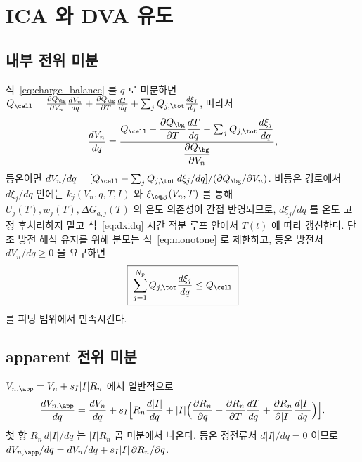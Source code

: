 \section{ICA 와 DVA 유도}\label{sec:ica}
\subsection{내부 전위 미분}
식~\eqref{eq:charge_balance} 를 $q$ 로 미분하면
$Q_\cell=\frac{\partial Q_\bg}{\partial V_n}\frac{dV_n}{dq}+\frac{\partial Q_\bg}{\partial T}\frac{dT}{dq}
+\sum_j Q_{j,\tot}\frac{d\xi_j}{dq}$, 따라서
\begin{equation}
\frac{dV_n}{dq}=\frac{Q_\cell-\dfrac{\partial Q_\bg}{\partial T}\dfrac{dT}{dq}-\sum_j Q_{j,\tot}\dfrac{d\xi_j}{dq}}
{\dfrac{\partial Q_\bg}{\partial V_n}},
\label{eq:dVdq_gen}
\end{equation}
등온이면 $dV_n/dq=[Q_\cell-\sum_j Q_{j,\tot}\,d\xi_j/dq]/(\partial Q_\bg/\partial V_n)$. 비등온 경로에서
$d\xi_j/dq$ 안에는 $k_j(V_n,q,T,I)$ 와 $\xi_{\eq,j}(V_n,T)$ 를 통해 $U_j(T),w_j(T),\Delta G_{a,j}(T)$ 의
온도 의존성이 간접 반영되므로, $d\xi_j/dq$ 를 온도 고정 후처리하지 말고 식~\eqref{eq:dxidq} 시간 적분
루프 안에서 $T(t)$ 에 따라 갱신한다. 단조 방전 해석 유지를 위해 분모는 식~\eqref{eq:monotone} 로
제한하고, 등온 방전서 $dV_n/dq\ge0$ 을 요구하면
\begin{equation}
\boxed{\;\sum_{j=1}^{N_p}Q_{j,\tot}\frac{d\xi_j}{dq}\le Q_\cell\;}
\label{eq:monoconstraint}
\end{equation}
를 피팅 범위에서 만족시킨다.

\subsection{apparent 전위 미분}
$V_{n,\app}=V_n+s_I|I|R_n$ 에서 일반적으로
\begin{equation}
\frac{dV_{n,\app}}{dq}=\frac{dV_n}{dq}+s_I\Big[R_n\frac{d|I|}{dq}
+|I|\Big(\frac{\partial R_n}{\partial q}+\frac{\partial R_n}{\partial T}\frac{dT}{dq}+\frac{\partial R_n}{\partial|I|}\frac{d|I|}{dq}\Big)\Big].
\label{eq:dVappdq_gen}
\end{equation}
첫 항 $R_n\,d|I|/dq$ 는 $|I|R_n$ 곱 미분에서 나온다. 등온 정전류서 $d|I|/dq=0$ 이므로
$dV_{n,\app}/dq=dV_n/dq+s_I|I|\,\partial R_n/\partial q$.

